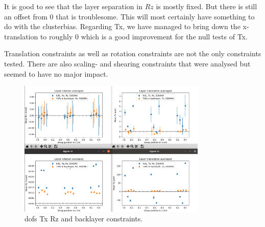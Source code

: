 It is good to see that the layer separation in $Rz$ is mostly fixed. But there is still an offset from 0 that is troublesome. This will most certainly have something to do with the clusterbias. Regarding Tx, we have managed to bring down the x-translation to roughly 0 which is a good improvement for the null tests of Tx.

Translation constraints as well as rotation constraints are not the only constraints tested. There are also scaling- and shearing constraints that were analysed but seemed to have
no major impact.

%



\begin{figure}
  \centering
  \includegraphics[width=0.8\textwidth]{plots/oct_4/TxRz_config5_backlayer.png}
  \caption{dofs Tx Rz and backlayer constraints.}
  \label{fig:oct4}
\end{figure}

